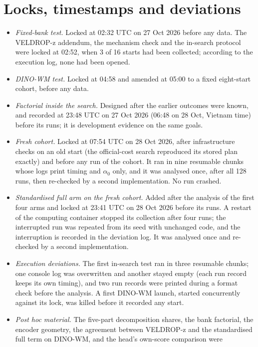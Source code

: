 \section{Locks, timestamps and deviations}
\label{app:locks}
\begin{itemize}[leftmargin=*,itemsep=1pt]
\item \emph{Fixed-bank test.} Locked at 02:32 UTC on 27 Oct 2026 before any data. The VELDROP-z addendum, the mechanism
  check and the in-search protocol were locked at 02:52, when 3 of 16 starts had been collected; according to the
  execution log, none had been opened.
\item \emph{DINO-WM test.} Locked at 04:58 and amended at 05:00 to a fixed eight-start cohort, before any data.
\item \emph{Factorial inside the search.} Designed after the earlier outcomes were known, and recorded at 23:48 UTC on
  27 Oct 2026 (06:48 on 28 Oct, Vietnam time) before its runs; it is development evidence on the same goals.
\item \emph{Fresh cohort.} Locked at 07:54 UTC on 28 Oct 2026, after infrastructure checks on an old start (the
  official-cost search reproduced its stored plan exactly) and before any run of the cohort. It ran in nine resumable
  chunks whose logs print timing and $\alpha_0$ only, and it was analysed once, after all 128 runs, then re-checked by a
  second implementation. No run crashed.
\item \emph{Standardised full arm on the fresh cohort.} Added after the analysis of the first four arms and locked at
  23:41 UTC on 28 Oct 2026 before its runs. A restart of the computing container stopped its collection after four
  runs; the interrupted run was repeated from its seed with unchanged code, and the interruption is recorded in the
  deviation log. It was analysed once and re-checked by a second implementation.
\item \emph{Execution deviations.} The first in-search test ran in three resumable chunks; one console log was
  overwritten and another stayed empty (each run record keeps its own timing), and two run records were printed during a
  format check before the analysis. A first DINO-WM launch, started concurrently against its lock, was killed before it
  recorded any start.
\item \emph{Post hoc material.} The five-part decomposition shares, the bank factorial, the encoder geometry, the
  agreement between VELDROP-z and the standardised full term on DINO-WM, and the head's own-score comparison were

\end{itemize}
